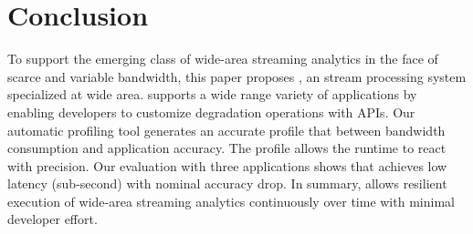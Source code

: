 \section{Conclusion}
\label{sec:conclusion}

To support the emerging class of wide-area streaming analytics in the face of
scarce and variable bandwidth, this paper proposes \sysname{}, an stream
processing system specialized at wide area. \sysname{} supports a wide range
variety of applications by enabling developers to customize degradation
operations with \maybe{} APIs. Our automatic profiling tool generates an
accurate profile that between bandwidth consumption and application
accuracy. The profile allows the runtime to react with precision. Our evaluation
with three applications shows that \sysname{} achieves low latency (sub-second)
with nominal accuracy drop. In summary, \sysname{} allows resilient execution of
wide-area streaming analytics continuously over time with minimal developer
effort.

